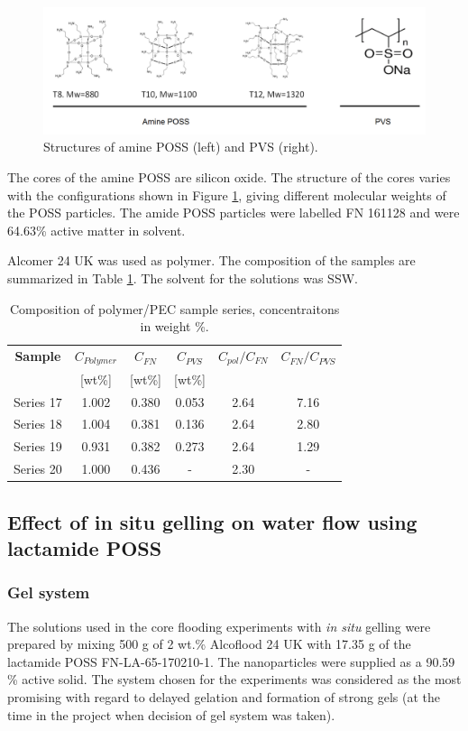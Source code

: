 \documentclass[nanomaterials,article,submit,moreauthors,pdftex]{Definitions/mdpi}
\begin{document}
\begin{figure}[h!]
    \centering
    \includegraphics[width=.7\textwidth]{fig/pvs.png}
    \caption{Structures of amine POSS (left) and PVS (right).}
    \label{fig:pvs}
\end{figure}

The cores of the amine POSS are silicon oxide. The structure of the cores varies with the configurations shown in Figure \ref{fig:pvs}, giving different molecular weights of the POSS particles. The amide POSS particles were labelled FN 161128 and were 64.63\% active matter in solvent.

Alcomer 24 UK was used as polymer. The composition of the samples are summarized in Table \ref{tab:polyPecComp}. The solvent for the solutions was SSW.

\begin{table}[h!] 

\centering
\caption{Composition of polymer/PEC sample series, concentraitons in weight \%.}
\label{tab:polyPecComp}
\begin{tabular}{c c c c c c } 
\toprule
\textbf{Sample} & \textbf{$C_{Polymer}$} & \textbf{$C_{FN}$} & \textbf{$C_{PVS}$} & \textbf{$C_{pol}/C_{FN}$} & \textbf{$C_{FN}/C_{PVS}$} \\ 
&[wt\%]& [wt\%] & [wt\%] && \\
\midrule 
Series 17   & 1.002   & 0.380 & 0.053 & 2.64 & 7.16\\
Series 18   & 1.004   & 0.381 & 0.136 & 2.64 & 2.80\\ 
Series 19   & 0.931   & 0.382 & 0.273 & 2.64 & 1.29\\ 
Series 20   & 1.000   & 0.436 & - & 2.30     & - \\
\bottomrule
\end{tabular}
\end{table}

\subsection{Effect of in situ gelling on water flow using lactamide POSS \label{sec:lactamide}}
\subsubsection{Gel system}
The solutions used in the core flooding experiments with \textit{in situ} gelling were prepared by mixing 500 g of 2 wt.\% Alcoflood 24 UK with 17.35 g of the lactamide POSS FN-LA-65-170210-1. The nanoparticles were supplied as a 90.59 \% active solid. The system chosen for the experiments was considered as the most promising with regard to delayed gelation and formation of strong gels (at the time in the project when decision of gel system was taken).
\end{document}
